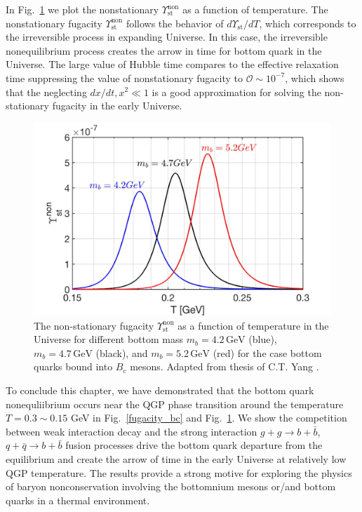 In Fig.~\ref{NonFugacity} we plot the nonstationary $\Upsilon^{\mathrm{non}}_\mathrm{st}$ as a function of temperature. The nonstationary fugacity $\Upsilon^{\mathrm{non}}_\mathrm{st}$ follows the behavior of $d\Upsilon_{\mathrm{st}}/dT$, which corresponds to the irreversible process in expanding Universe. In this case, the irreversible nonequilibrium process creates the arrow in time for bottom quark in the Universe. The large value of Hubble time compares to the effective relaxation time suppressing the value of nonstationary fugacity to $\mathcal{O}\sim10^{-7}$, which shows that the neglecting $dx/dt,x^2\ll1$ is a good approximation for solving the non-stationary fugacity in the early Universe.
\begin{figure}[t]
\begin{center}
\includegraphics[width=\textwidth]{./plots/NonstationaryFugacity}
\caption{The non-stationary fugacity $\Upsilon_\mathrm{st}^{\mathrm{non}}$ as a function of temperature in the Universe for different bottom mass $m_b=4.2\,\mathrm{GeV}$ (blue), $m_b=4.7\,\mathrm{GeV}$ (black), and $m_b=5.2\,\mathrm{GeV}$ (red) for the case bottom  quarks bound into $B_c$ mesons. Adapted from thesis of C.T. Yang \cite{Yang:2024ret}.}
\label{NonFugacity}
\end{center}
\end{figure}

To conclude this chapter, we have demonstrated that the bottom quark nonequliibrium occurs near the QGP phase transition around the temperature $T=0.3\sim0.15$ GeV in Fig.~\ref{fugacity_bc} and Fig.~\ref{NonFugacity}. We show the competition between weak interaction decay and the strong interaction $g+g\to b+\bar b$, $q+\bar q \to b+\bar b$ fusion processes drive the bottom quark departure from the equilibrium and create the arrow of time in the early Universe at relatively low QGP temperature. The results provide a strong motive for exploring the physics of baryon nonconservation involving the bottomnium mesons or/and bottom quarks in a thermal environment.

